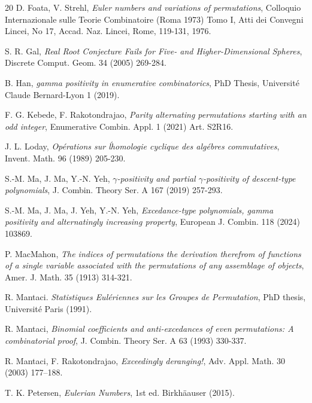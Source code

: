 \documentclass[12pt]{article}
\begin{document}
\begin{thebibliography}{20}
D. Foata, V. Strehl, \textit{Euler numbers and variations of permutations}, 
Colloquio Internazionale sulle Teorie Combinatoire (Roma 1973) Tomo I, Atti dei Convegni Lincei, No 17, Accad. Naz. Lincei, Rome, 119-131, 1976.

S. R. Gal, \textit{Real Root Conjecture Fails for Five- and Higher-Dimensional Spheres}, Discrete Comput. Geom. 34 (2005) 269-284. 

B. Han, 
\textit{gamma positivity in enumerative combinatorics}, PhD Thesis, Universit{\'e} Claude Bernard-Lyon 1 (2019). 

F. G. Kebede, F. Rakotondrajao, \textit{Parity alternating permutations starting with an odd integer}, Enumerative Combin. Appl. 1 (2021) Art. S2R16. 

J. L. Loday, \textit{Op{\'e}rations sur {\'l}homologie cyclique des alg{\'e}bres commutatives}, Invent. Math. 96 (1989) 205-230.

S.-M. Ma, J. Ma, Y.-N. Yeh, \textit{$\gamma$-positivity and partial $\gamma$-positivity of descent-type polynomials}, J. Combin. Theory Ser. A 167 (2019) 257-293.

S.-M. Ma, J. Ma, J. Yeh, Y.-N. Yeh, \textit{Excedance-type polynomials, gamma positivity and alternatingly increasing property}, European J. Combin. 118 (2024) 103869.

P. MacMahon, \textit{The indices of permutations the derivation therefrom of functions of a single variable associated with the
permutations of any assemblage of objects}, Amer. J. Math. 35 (1913) 314-321.

R. Mantaci. \textit{Statistiques Eul{\'e}riennes sur les Groupes de Permutation}, PhD thesis, Université Paris (1991).

R. Mantaci, \textit{Binomial coefficients and anti-excedances of even permutations: A combinatorial proof}, J. Combin. Theory Ser. A 63 (1993) 330-337.

R. Mantaci, F. Rakotondrajao, \textit{Exceedingly deranging!}, Adv. Appl. Math. 30 (2003) 177–188. 

T. K. Petersen, \textit{Eulerian Numbers}, 1st ed.  
Birkh{\"a}auser (2015). 


\end{thebibliography}
\end{document}
